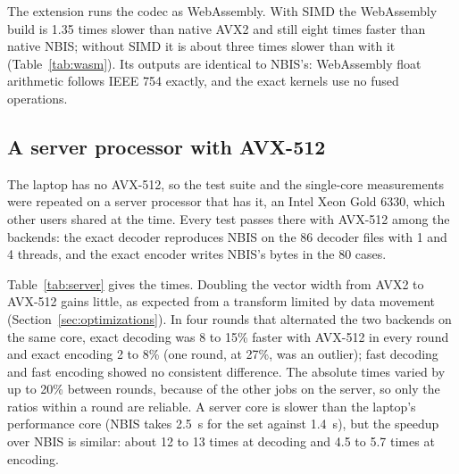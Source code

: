The extension runs the codec as WebAssembly. With SIMD the WebAssembly build is 1.35 times
slower than native AVX2 and still eight times faster than native NBIS; without SIMD it is about
three times slower than with it (Table~\ref{tab:wasm}). Its outputs are identical to NBIS's: WebAssembly
float arithmetic follows IEEE 754 exactly, and the exact kernels use no fused operations.



\subsection{A server processor with AVX-512}
\label{sec:server}

The laptop has no AVX-512, so the test suite and the single-core measurements were repeated on a
server processor that has it, an Intel Xeon Gold 6330, which other users shared at the time.
Every test passes there with AVX-512 among the backends: the exact decoder reproduces NBIS on the
86 decoder files with 1 and 4 threads, and the exact encoder writes NBIS's bytes in the 80 cases.

Table~\ref{tab:server} gives the times. Doubling the vector width from AVX2 to AVX-512 gains
little, as expected from a transform limited by data movement (Section~\ref{sec:optimizations}).
In four rounds that alternated the two backends on the same core, exact decoding was 8 to 15\%
faster with AVX-512 in every round and exact encoding 2 to 8\% (one round, at 27\%, was an
outlier); fast decoding and fast encoding showed no consistent difference. The absolute times
varied by up to 20\% between rounds, because of the other jobs on the server, so only the ratios
within a round are reliable. A server core is slower than the laptop's performance core (NBIS takes
2.5~s for the set against 1.4~s), but the speedup over NBIS is similar: about 12 to 13 times at
decoding and 4.5 to 5.7 times at encoding.


